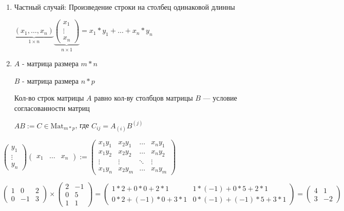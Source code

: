 \begin{enumerate}[label=(\arabic*)]
	\item 
		Частный случай: Произведение строки на столбец одинаковой длинны 
	
		\( \underbrace{(x_1, \dots, x_n)}_{1 \times n} \underbrace{\begin{pmatrix}
			x_1 \\ \vdots \\ x_n
		\end{pmatrix}}_{n \times 1} = x_1 * y_1 + \dots + x_n * y_n \)
		
	\item
		\( A \) - матрица размера \( m * n \)
		
		\( B \) - матрица размера \( n * p \)
		
		Кол-во строк матрицы \( A \) равно кол-ву столбцов матрицы \( B \) --- условие согласованности матриц
		
		\( AB := C \in \text{Mat}_{m*p}\), где \( C_{ij} = A_{(i)} B^{(j)}\)
\end{enumerate}

\begin{example}
	\( \begin{pmatrix}
		y_1 \\ \vdots \\ y_n
	\end{pmatrix} 
	\begin{pmatrix}
		x_1 & \dots & x_n
	\end{pmatrix}
	:= 
	\begin{pmatrix}
		x_1 y_1 & x_2 y_1 & \dots & x_n y_1 \\
		x_1 y_2 & x_2 y_2 & \dots & x_n y_2 \\
		\vdots & \vdots & \ddots & \vdots \\
		x_1 y_n & x_2 y_m & \dots & x_n y_m 
	\end{pmatrix} \)
\end{example}

\begin{example}
	\(
		\begin{pmatrix}
			1 & 0 & 2 \\
			0 & -1 & 3
		\end{pmatrix}
		\times
		\begin{pmatrix}
			2 & -1 \\
			0 & 5 \\
			1 & 1
		\end{pmatrix}
		=
		\begin{pmatrix}
			1 * 2 + 0 * 0 + 2 * 1 & 1 * (-1) + 0 * 5 + 2 * 1 \\
			0 * 2 + (-1) * 0 + 3 * 1 & 0 * (-1) + (-1) * 5 + 3 * 1
		\end{pmatrix}
		=
		\begin{pmatrix}
			4 & 1 \\
			3 & -2
		\end{pmatrix}
	\)
\end{example}
